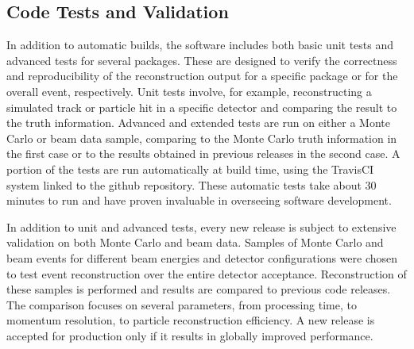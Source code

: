 \subsection{Code Tests and Validation}
\label{sec:tests}

In addition to automatic builds, the software includes both basic unit tests and advanced tests for several
packages. These are designed to verify the correctness and reproducibility of the reconstruction output for a
specific package or for the overall event, respectively. Unit tests involve, for example, reconstructing a simulated
track or particle hit in a specific detector and comparing the result to the truth information. Advanced and extended
tests are run on either a Monte Carlo or beam data sample, comparing to the Monte Carlo truth information in the first
case or to the results obtained in previous releases in the second case. A portion of the tests are run automatically
at build time, using the TravisCI system linked to the github repository.  These automatic tests take about 30
minutes to run and have proven invaluable in overseeing software development.

In addition to unit and advanced tests, every new release is subject to extensive validation on both Monte Carlo and
beam data. Samples of Monte Carlo and beam events for different beam energies and detector configurations were
chosen to test event reconstruction over the entire detector acceptance. Reconstruction of these samples is
performed and results are compared to previous code releases. The comparison focuses on several parameters, from
processing time, to momentum resolution, to particle reconstruction efficiency. A new release is accepted for
production only if it results in globally improved performance. 
